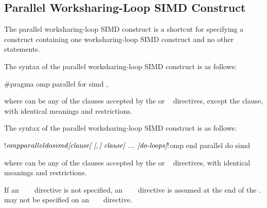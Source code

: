 \subsection{Parallel Worksharing-Loop SIMD Construct}
\label{subsec:Parallel Worksharing-Loop SIMD Construct}
\summary
The parallel worksharing-loop SIMD construct is a shortcut for specifying a 
 construct containing one worksharing-loop SIMD construct and 
no other statements.

\begin{samepage}
\syntax
\begin{ccppspecific}
The syntax of the parallel worksharing-loop SIMD construct is as follows:

\begin{ompcPragma}
#pragma omp parallel for simd \plc{[clause[ [},\plc{] clause] ... ] new-line}
\end{ompcPragma}

where  can be any of the clauses accepted by the 
or ~ directives, except the  clause, with
identical meanings and restrictions.
\end{ccppspecific}
\end{samepage}

\begin{fortranspecific}
\begin{samepage}
The syntax of the parallel worksharing-loop SIMD construct is as follows:

\begin{ompfPragma}
!$omp parallel do simd \plc{[clause[ [},\plc{] clause] ... ]}
    \plc{do-loops}
\plc{[}!$omp end parallel do simd\plc{]}
\end{ompfPragma}
\end{samepage}

where  can be any of the clauses accepted by the 
or ~ directives, with identical meanings and restrictions.

\begin{samepage}
If an ~~~ directive is not specified, an
~~~ directive is assumed at the end of the
.  may not be specified on
an ~ ~ directive.
\end{samepage}
\end{fortranspecific}

